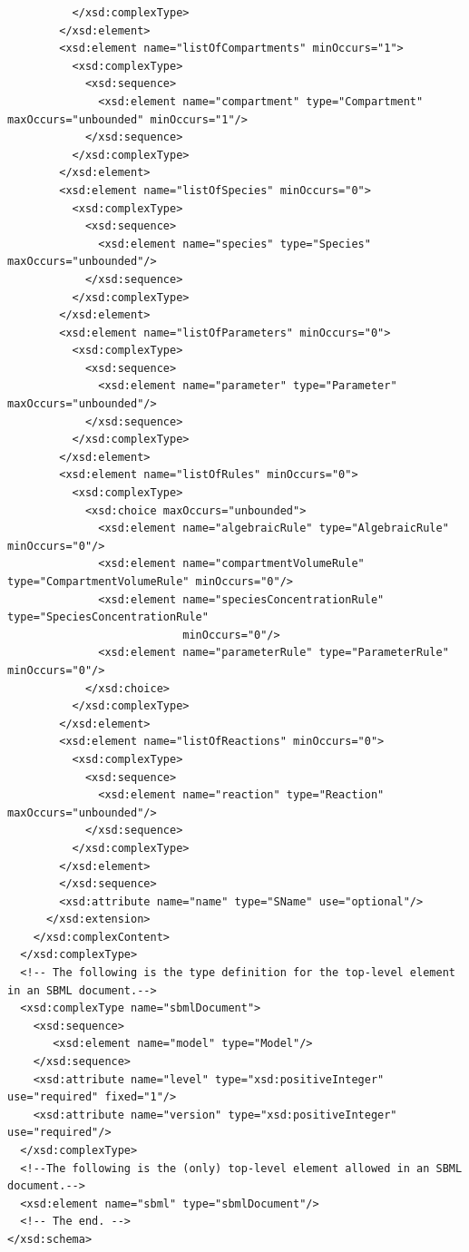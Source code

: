 \documentclass[10pt]{cekarticle}
\begin{document}
\begin{small}
\begin{verbatim}
          </xsd:complexType>
        </xsd:element>
        <xsd:element name="listOfCompartments" minOccurs="1">
          <xsd:complexType>
            <xsd:sequence>
              <xsd:element name="compartment" type="Compartment" maxOccurs="unbounded" minOccurs="1"/>
            </xsd:sequence>
          </xsd:complexType>
        </xsd:element>
        <xsd:element name="listOfSpecies" minOccurs="0">
          <xsd:complexType>
            <xsd:sequence>
              <xsd:element name="species" type="Species" maxOccurs="unbounded"/>
            </xsd:sequence>
          </xsd:complexType>
        </xsd:element>
        <xsd:element name="listOfParameters" minOccurs="0">
          <xsd:complexType>
            <xsd:sequence>
              <xsd:element name="parameter" type="Parameter" maxOccurs="unbounded"/>
            </xsd:sequence>
          </xsd:complexType>
        </xsd:element>
        <xsd:element name="listOfRules" minOccurs="0">
          <xsd:complexType>
            <xsd:choice maxOccurs="unbounded">
              <xsd:element name="algebraicRule" type="AlgebraicRule" minOccurs="0"/>
              <xsd:element name="compartmentVolumeRule" type="CompartmentVolumeRule" minOccurs="0"/>
              <xsd:element name="speciesConcentrationRule" type="SpeciesConcentrationRule" 
                           minOccurs="0"/>
              <xsd:element name="parameterRule" type="ParameterRule" minOccurs="0"/>
            </xsd:choice>
          </xsd:complexType>
        </xsd:element>
        <xsd:element name="listOfReactions" minOccurs="0">
          <xsd:complexType>
            <xsd:sequence>
              <xsd:element name="reaction" type="Reaction" maxOccurs="unbounded"/>
            </xsd:sequence>
          </xsd:complexType>
        </xsd:element>
      	</xsd:sequence>
      	<xsd:attribute name="name" type="SName" use="optional"/>
      </xsd:extension>
    </xsd:complexContent>
  </xsd:complexType>
  <!-- The following is the type definition for the top-level element in an SBML document.-->
  <xsd:complexType name="sbmlDocument">
    <xsd:sequence>
       <xsd:element name="model" type="Model"/>
    </xsd:sequence>
    <xsd:attribute name="level" type="xsd:positiveInteger" use="required" fixed="1"/>
    <xsd:attribute name="version" type="xsd:positiveInteger" use="required"/>
  </xsd:complexType>
  <!--The following is the (only) top-level element allowed in an SBML document.-->
  <xsd:element name="sbml" type="sbmlDocument"/>
  <!-- The end. -->
</xsd:schema>
\end{verbatim}
\regularspacing
\end{small}
\end{document}
